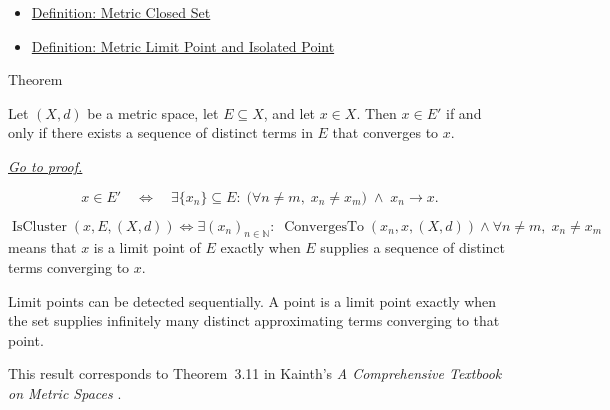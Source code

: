 \begin{dependencies}
\begin{itemize}
  \item \hyperref[def:metric-closed-set]{Definition: Metric Closed Set}
  \item \hyperref[def:metric-limit-point-isolated-point]{Definition: Metric Limit Point and Isolated Point}
\end{itemize}
\end{dependencies}

\begin{theorembox}{Theorem}
\begin{theorem}
\label{thm:metric-limit-point-sequential-characterization}
Let \((X,d)\) be a metric space, let \(E\subseteq X\), and let \(x\in X\).
Then \(x\in E'\) if and only if there exists a sequence of distinct terms in
\(E\) that converges to \(x\).

\smallskip
\noindent
\hyperref[prf:metric-limit-point-sequential-characterization]{\textit{Go to proof.}}
\end{theorem}
\end{theorembox}

\begin{remark*}
\[
x\in E'
\quad\Longleftrightarrow\quad
\exists \{x_n\}\subseteq E{:}\;
\bigl(\forall n\neq m,\;x_n\neq x_m\bigr)
\;\land\;
x_n\to x.
\]
\end{remark*}

\begin{remark*}
\[
\operatorname{IsCluster}(x,E,(X,d))
\Longleftrightarrow
\exists (x_n)_{n\in\mathbb{N}}{:}\;
\operatorname{ConvergesTo}(x_n,x,(X,d))
\land
\forall n\neq m,\;x_n\neq x_m
\]
means that \(x\) is a limit point of \(E\) exactly when \(E\) supplies a
sequence of distinct terms converging to \(x\).
\end{remark*}

\begin{remark*}[Interpretation]
Limit points can be detected sequentially.  A point is a limit point exactly
when the set supplies infinitely many distinct approximating terms converging
to that point.
\end{remark*}

\begin{remark*}
This result corresponds to Theorem~3.11 in Kainth's
\emph{A Comprehensive Textbook on Metric Spaces}
\cite{KainthComprehensiveMetricSpaces2023}.
\end{remark*}

